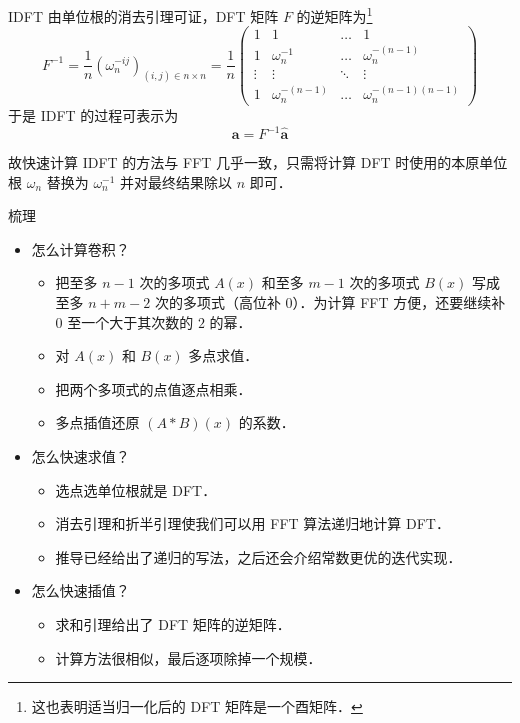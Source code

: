 \documentclass[fontset=fandol]{ctexbeamer}
\renewcommand{\vec}{\boldsymbol}
\begin{document}
\begin{frame}{IDFT}
由单位根的消去引理可证，DFT 矩阵 $F$ 的逆矩阵为\footnote{这也表明适当归一化后的 DFT 矩阵是一个酉矩阵．}
\[
F^{-1} = \frac 1 n \left( \omega_n^{-ij} \right)_{(i,j) \in n \times n} = \frac 1 n \begin{pmatrix}
1 & 1 & \dots & 1 \\
1 & \omega_n^{-1} & \dots & \omega_n^{-(n-1)} \\
\vdots & \vdots & \ddots & \vdots \\
1 & \omega_n^{-(n-1)} & \dots & \omega_n^{-(n-1)(n-1)}
\end{pmatrix}
\]
于是 IDFT 的过程可表示为
\[ \vec a  = F^{-1} \hat{\vec a} \]

故快速计算 IDFT 的方法与 FFT 几乎一致，只需将计算 DFT 时使用的本原单位根 $\omega_n$ 替换为 $\omega_n^{-1}$ 并对最终结果除以 $n$ 即可．
\end{frame}

\begin{frame}{梳理}
    \begin{itemize}
        \item 怎么计算卷积？
        \begin{itemize}
            \item 把至多 $n-1$ 次的多项式 $A(x)$ 和至多 $m-1$ 次的多项式 $B(x)$ 写成至多 $n+m-2$ 次的多项式（高位补 $0$）．为计算 FFT 方便，还要继续补 $0$ 至一个大于其次数的 $2$ 的幂．
            \item 对 $A(x)$ 和 $B(x)$ 多点求值．
            \item 把两个多项式的点值逐点相乘．
            \item 多点插值还原 $(A*B)(x)$ 的系数．
        \end{itemize}
        \item 怎么快速求值？
            \begin{itemize}
                \item 选点选单位根就是 DFT．
                \item 消去引理和折半引理使我们可以用 FFT 算法递归地计算 DFT．
                \item 推导已经给出了递归的写法，之后还会介绍常数更优的迭代实现．
            \end{itemize}
        \item 怎么快速插值？
            \begin{itemize}
                \item 求和引理给出了 DFT 矩阵的逆矩阵．
                \item 计算方法很相似，最后逐项除掉一个规模．
            \end{itemize}
    \end{itemize}
\end{frame}
\end{document}
